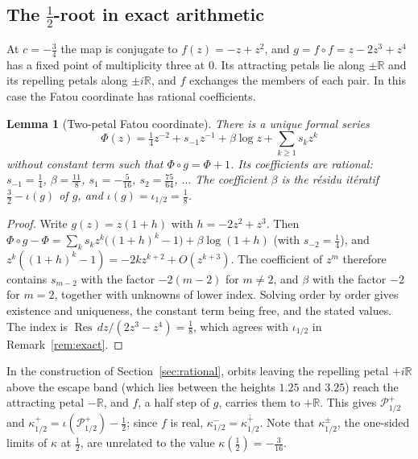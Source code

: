 \documentclass[11pt]{amsart}
\newtheorem{lemma}[theorem]{Lemma}
\theoremstyle{definition}
\theoremstyle{remark}
\newcommand{\R}{\mathbb{R}}
\newcommand{\Ph}{\mathcal{P}^+_{1/2}}
\newcommand{\Res}{\operatorname*{Res}}
\begin{document}
\subsection{The $\frac12$-root in exact arithmetic}\label{sec:half}
At $c=-\frac34$ the map is conjugate to $f(z)=-z+z^2$, and $g=f\circ f=z-2z^3+z^4$ has a fixed point of multiplicity three at $0$. Its attracting petals lie along $\pm\R$ and its repelling petals along $\pm i\R$, and $f$ exchanges the members of each pair. In this case the Fatou coordinate has rational coefficients.

\begin{lemma}[Two-petal Fatou coordinate]\label{lem:fatou2}
There is a unique formal series
\[
\Phi(z)=\tfrac14z^{-2}+s_{-1}z^{-1}+\beta\log z+\sum_{k\ge1}s_kz^k
\]
without constant term such that $\Phi\circ g=\Phi+1$. Its coefficients are rational: $s_{-1}=\frac14$, $\beta=\frac{11}8$, $s_1=-\frac5{16}$, $s_2=\frac{75}{64}$, $\ldots$ The coefficient $\beta$ is the r\'esidu it\'eratif $\frac32-\iota(g)$ of $g$, and $\iota(g)=\iota_{1/2}=\frac18$.
\end{lemma}

\begin{proof}
Write $g(z)=z(1+h)$ with $h=-2z^2+z^3$. Then $\Phi\circ g-\Phi=\sum_ks_kz^k\bigl((1+h)^k-1\bigr)+\beta\log(1+h)$ (with $s_{-2}=\frac14$), and $z^k((1+h)^k-1)=-2kz^{k+2}+O(z^{k+3})$. The coefficient of $z^m$ therefore contains $s_{m-2}$ with the factor $-2(m-2)$ for $m\ne2$, and $\beta$ with the factor $-2$ for $m=2$, together with unknowns of lower index. Solving order by order gives existence and uniqueness, the constant term being free, and the stated values. The index is $\Res\,dz/(2z^3-z^4)=\frac18$, which agrees with $\iota_{1/2}$ in Remark~\ref{rem:exact}.
\end{proof}

In the construction of Section~\ref{sec:rational}, orbits leaving the repelling petal $+i\R$ above the escape band (which lies between the heights $1.25$ and $3.25$) reach the attracting petal $-\R$, and $f$, a half step of $g$, carries them to $+\R$. This gives $\Ph$ and $\kappa^+_{1/2}=\iota(\Ph)-\frac12$; since $f$ is real, $\kappa^-_{1/2}=\overline{\kappa^+_{1/2}}$. Note that $\kappa^\pm_{1/2}$, the one-sided limits of $\kappa$ at $\frac12$, are unrelated to the value $\kappa(\frac12)=-\frac3{16}$.
\end{document}
